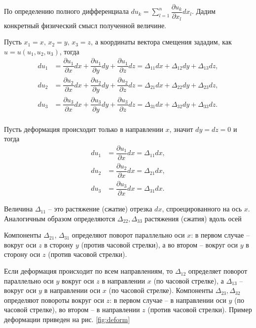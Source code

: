 \documentclass[12pt,a4paper]{article}
\begin{document}
    По определению полного дифференциала $du_k = \displaystyle \sum_{l = 1}^{n} \dfrac{\partial u_k}{\partial x_l} dx_l$. Дадим конкретный физический смысл полученной величине.  

    Пусть $ x_1 = x,\, x_2 = y,\, x_3 = z $, а координаты вектора смещения зададим, как $ u = u(u_1, u_2, u_3)$, тогда 
    \[
      \begin{split}
        du_1 &= \dfrac{\partial u_1}{\partial x}dx + \dfrac{\partial u_1}{\partial y}dy + \dfrac{\partial u_1}{\partial z}dz = \Delta_{11}dx + \Delta_{12}dy + \Delta_{13}dz,  \\[0.7em]
        du_2 &= \dfrac{\partial u_2}{\partial x}dx + \dfrac{\partial u_2}{\partial y}dy + \dfrac{\partial u_2}{\partial z}dz = \Delta_{21}dx + \Delta_{22}dy + \Delta_{23}dz, \\[0.7em]
        du_3 &= \dfrac{\partial u_3}{\partial x}dx + \dfrac{\partial u_3}{\partial y}dy + \dfrac{\partial u_3}{\partial z}dz = \Delta_{31}dx + \Delta_{32}dy + \Delta_{33}dz. \\
      \end{split}
    \]

    Пусть деформация происходит только в направлении $x$, значит $dy = dz = 0$ и тогда 
    \[
      \begin{split}
        du_1 &= \dfrac{\partial u_1}{\partial x}dx = \Delta_{11}dx, \\[0.7em]
        du_2 &= \dfrac{\partial u_2}{\partial x}dx = \Delta_{21}dx, \\[0.7em]
        du_3 &= \dfrac{\partial u_3}{\partial x}dx = \Delta_{31}dx.
      \end{split}
    \]
    
    Величина $ \Delta_{11} $ -- это растяжение (сжатие) отрезка $dx$, спроецированного на ось $x$. Аналогичным образом определяются $\Delta_{22}, \Delta_{33}$ растяжения (сжатия) вдоль осей 

    Компоненты $\Delta_{21},\, \Delta_{31}$ определяют поворот параллельно оси $x$: в первом случае -- вокруг оси $z$ в сторону $y$ (против часовой стрелки), а во втором -- вокруг оси $y$ в сторону оси $z$ (против часовой стрелки). 
    
    Если деформация происходит по всем направлениям, то $\Delta_{12}$ определяет поворот параллельно оси $y$ вокруг оси $z$ в направлении $x$ (по часовой стрелке), а $ \Delta_{13} $ -- вокруг оси $y$ в направлении оси $x$ (по часовой стрелке). Компоненты $\Delta_{23}, \Delta_{32}$ определяют повороты вокруг оси $z$: в первом случае -- в направлении оси $y$ (по часовой стрелке), во втором -- в направлении $z$ (против часовой стрелки). Пример деформации приведен на рис. \ref{fig:deform}
\end{document}
